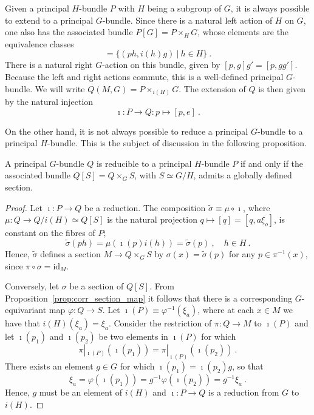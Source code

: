 \documentclass[11pt]{article}
\begin{document}
Given a principal $H$-bundle $P$ with $H$ being a subgroup of 
$G$, it is always possible to extend to a principal $G$-bundle.  
Since there is a natural left action of $H$ on $G$, one also has 
the associated bundle $P[G] = P \times_H G$, whose elements are 
the equivalence classes
\begin{displaymath}
	[p,g] = \{(ph,i(h)g)~|~h \in H \}~.
\end{displaymath}
There is a natural right $G$-action on this bundle, given by 
$[p,g]g' = [p,gg']$. Because the left and right actions commute, 
this is a well-defined principal $G$-bundle. We will write 
$Q(M,G) = P \times_{i(H)} G$. The extension of $Q$ is then given 
by the natural injection
\begin{equation}
	\imath : P \to Q : p \mapsto [p,e]~.
\end{equation}

On the other hand, it is not always possible to reduce a 
principal $G$-bundle to a principal $H$-bundle. This is the 
subject of discussion in the following proposition.

\begin{proposition}
	A principal $G$-bundle $Q$ is reducible to a principal 
	$H$-bundle $P$ if and only if the associated bundle $Q[S] = Q 
	\times_G S$, with $S \simeq G/H$, admits a globally defined 
	section.
\end{proposition}
\begin{proof}
	Let $\imath : P \to Q$ be a reduction. The composition 
	$\tilde{\sigma} \equiv \mu \circ \imath$, where $\mu : Q \to 
	Q/i(H) \simeq Q[S]$ is the natural projection $q \mapsto [q] = 
	[q,a\xi_o]$, is constant on the fibres of $P$;
	\begin{displaymath}
		\tilde{\sigma}(ph)  = \mu(\imath(p)i(h)) = 
		\tilde{\sigma}(p)~,\quad h \in H~.
	\end{displaymath}
	Hence, $\tilde{\sigma}$ defines a section $M \to Q \times_G S$ 
	by $\sigma(x) = \tilde{\sigma}(p)$ for any $p \in 
	\pi^{-1}(x)$, since $\pi \circ \sigma = \mathrm{id}_M$.

	Conversely, let $\sigma$ be a section of $Q[S]$. From 
	Proposition~\ref{prop:corr_section_map} it follows that there 
	is a corresponding $G$-equivariant map $\varphi : Q \to S$.  
	Let $\imath(P) \equiv \varphi^{-1}(\xi_a)$, where at each $x 
	\in M$ we have that $i(H)(\xi_a) = \xi_a$. Consider the 
	restriction of $\pi : Q \to M$ to $\imath(P)$ and let 
	$\imath(p_1)$ and $\imath(p_2)$ be two elements in $\imath(P)$ 
	for which
	\begin{displaymath}
		\pi|_{\imath(P)}(\imath(p_1)) = 
		\pi|_{\imath(P)}(\imath(p_2))~.
	\end{displaymath}
	There exists an element $g \in G$ for which $\imath(p_1) = 
	\imath(p_2)g$, so that
	\begin{displaymath}
		\xi_a = \varphi(\imath(p_1)) = g^{-1}\varphi(\imath(p_2)) = 
		g^{-1}\xi_a~.
	\end{displaymath}
	Hence, $g$ must be an element of $i(H)$ and $\imath : P \to Q$ 
	is a reduction from $G$ to $i(H)$.
\end{proof}
\end{document}
